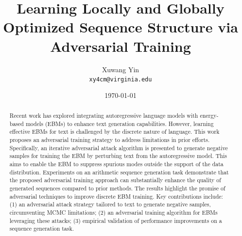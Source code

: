 \documentclass[11pt]{article}
\title{Learning Locally and Globally Optimized Sequence Structure via Adversarial Training}
\author{Xuwang Yin \\{\texttt{xy4cm@virginia.edu}}}
\date{\today}
\begin{document}
\maketitle

\begin{abstract}

  Recent work has explored integrating autoregressive language models with energy-based models (EBMs) to enhance text generation capabilities. However, learning effective EBMs for text is challenged by the discrete nature of language. This work proposes an adversarial training strategy to address limitations in prior efforts. Specifically, an iterative adversarial attack algorithm is presented to generate negative samples for training the EBM by perturbing text from the autoregressive model. This aims to enable the EBM to suppress spurious modes outside the support of the data distribution. Experiments on an arithmetic sequence generation task demonstrate that the proposed adversarial training approach can substantially enhance the quality of generated sequences compared to prior methods. The results highlight the promise of adversarial techniques to improve discrete EBM training. Key contributions include: (1) an adversarial attack strategy tailored to text to generate negative samples, circumventing MCMC limitations; (2) an adversarial training algorithm for EBMs leveraging these attacks; (3) empirical validation of performance improvements on a sequence generation task.

\end{abstract}


\end{document}
